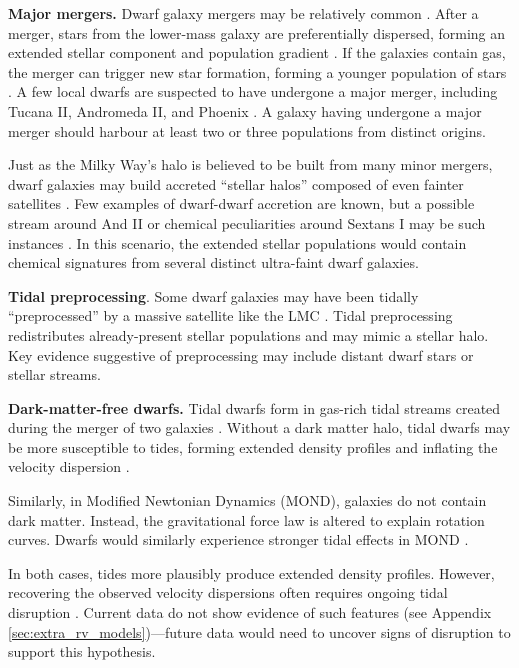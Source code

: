 \textbf{Major mergers.} Dwarf galaxy mergers may be relatively common
\citep{deason+wetzel+garrison-kimmel2014}. After a merger, stars from
the lower-mass galaxy are preferentially dispersed, forming an extended
stellar component and population gradient
\citep{benitez-llambay+2016, deason+2022}. If the galaxies contain gas,
the merger can trigger new star formation, forming a younger population
of stars \citep[e.g.,][]{genina+2019}. A few local dwarfs are suspected
to have undergone a major merger, including Tucana II, Andromeda II, and
Phoenix
\citep{lokas+2014, fouquet+2017, tarumi+yoshida+frebel2021, cardona-barrero+2021, querci+2025}.
A galaxy having undergone a major merger should harbour at least two or
three populations from distinct origins.

Just as the Milky Way's halo is believed to be built from many minor
mergers, dwarf galaxies may build accreted ``stellar halos'' composed of
even fainter satellites \citep{ricotti+polisensky+cleland2022}. Few
examples of dwarf-dwarf accretion are known, but a possible stream
around And II or chemical peculiarities around Sextans I may be such
instances \citep{amorisco+evans+vandeven2014, roederer+2023}. In this
scenario, the extended stellar populations would contain chemical
signatures from several distinct ultra-faint dwarf galaxies.

\textbf{Tidal preprocessing}. Some dwarf galaxies may have been tidally
``preprocessed'' by a massive satellite like the LMC
\citep[e.g.,][]{santistevan+2023, riley+2024}. Tidal preprocessing
redistributes already-present stellar populations and may mimic a
stellar halo. Key evidence suggestive of preprocessing may include
distant dwarf stars or stellar streams.

\textbf{Dark-matter-free dwarfs.} Tidal dwarfs form in gas-rich tidal
streams created during the merger of two galaxies
\citep[e.g.,][]{mirabel+dottori+lutz1992, bournaud+duc2006}. Without a
dark matter halo, tidal dwarfs may be more susceptible to tides, forming
extended density profiles and inflating the velocity dispersion
\citep{casas+2012, yang+2014, wang+2024a}.

Similarly, in Modified Newtonian Dynamics (MOND), galaxies do not
contain dark matter. Instead, the gravitational force law is altered to
explain rotation curves. Dwarfs would similarly experience stronger
tidal effects in MOND \citep{mcgaugh+wolf2010, brada+milgrom2000}.

In both cases, tides more plausibly produce extended density profiles.
However, recovering the observed velocity dispersions often requires
ongoing tidal disruption
\citetext{\citealp{mcgaugh+wolf2010}; \citealp[but see
also][]{sanchez-salcedo+hernandez2007}}. Current data do not show
evidence of such features (see Appendix
\ref{sec:extra_rv_models})---future data would need to uncover signs of
disruption to support this hypothesis.

